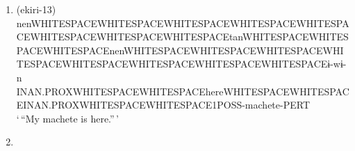 \documentclass{article}
\begin{document}
\begin{enumerate}
\def\labelenumi{(\arabic{enumi})}
\item
  (ekiri-13)\\
  nen\textbar WHITESPACE\textbar\textbar WHITESPACE\textbar\textbar WHITESPACE\textbar\textbar WHITESPACE\textbar\textbar WHITESPACE\textbar\textbar WHITESPACE\textbar\textbar WHITESPACE\textbar\textbar WHITESPACE\textbar tan\textbar WHITESPACE\textbar\textbar WHITESPACE\textbar\textbar WHITESPACE\textbar nen\textbar WHITESPACE\textbar\textbar WHITESPACE\textbar\textbar WHITESPACE\textbar\textbar WHITESPACE\textbar\textbar WHITESPACE\textbar\textbar WHITESPACE\textbar\textbar WHITESPACE\textbar\textbar WHITESPACE\textbar ɨ-wɨ-n\\
  INAN.PROX\textbar WHITESPACE\textbar\textbar WHITESPACE\textbar here\textbar WHITESPACE\textbar\textbar WHITESPACE\textbar INAN.PROX\textbar WHITESPACE\textbar\textbar WHITESPACE\textbar1POSS-machete-PERT\\
  `\,``My machete is here.''\,'
\item
\end{enumerate}
\end{document}

